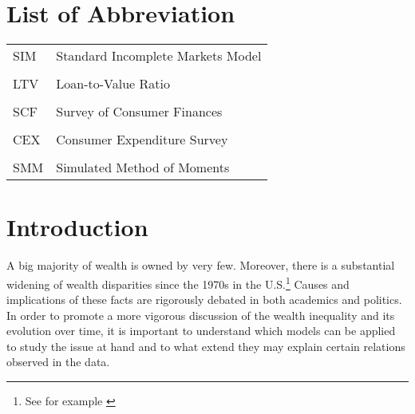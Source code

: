 \documentclass[a4paper,12pt,legno]{article}
\begin{document}
 \newpage
\thispagestyle{empty}
\listoffigures

 \newpage
 
	\thispagestyle{empty}
	\section*{List of Abbreviation}
	
	\begin{table}[!htbp]
		\centering
	\begin{flushleft}  
	   \begin{tabular}{ll}
	    SIM   & Standard Incomplete Markets Model \\ \\
	    LTV   & Loan-to-Value Ratio \\ \\
	    SCF	  & Survey of Consumer Finances \\ \\
	    CEX	  & Consumer Expenditure Survey \\ \\
	    SMM   & Simulated Method of Moments
	    \end{tabular}%
	\end{flushleft}
	\end{table}%
	\newpage



\setcounter{page}{1}        %


\section{Introduction}
\label{Introduction}

A big majority of wealth is owned by very few. Moreover, there is a substantial widening of wealth disparities since the 1970s in the U.S.\footnote{See for example \citet{kuhn2017income}} Causes and implications of these facts are rigorously debated in both academics and politics. In order to promote a more vigorous discussion of the wealth inequality and its evolution over time, it is important to understand which models can be applied to study the issue at hand and to what extend they may explain certain relations observed in the data.\\
\end{document}
